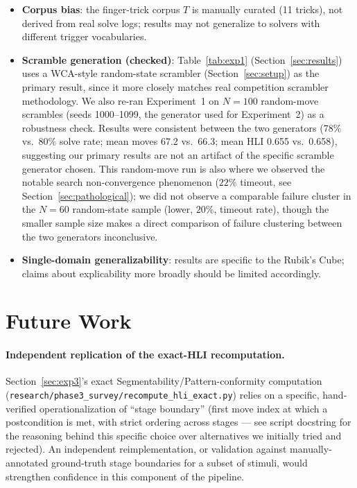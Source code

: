\documentclass[10pt,conference]{article}
\begin{document}
\begin{itemize}
    reliability (ICC(2,k)$=0.91$) --- the RQ-V1 correlation should
    be read as a correlation with a stable group mean, not with any
    single rater's judgment. \emph{Note: these ICC figures were
    initially taken from the survey write-up; they have since been
    independently re-derived from the raw per-rater rating matrix (28
    real CSV files, see
    \texttt{research/phase3\_survey/compute\_icc.py}), matching
    exactly: ICC(2,1)$=0.2563$, ICC(2,k)$=0.9061$.}
  \item \textbf{Corpus bias}: the finger-trick corpus $T$ is
    manually curated (11 tricks), not derived from real solve logs;
    results may not generalize to solvers with different trigger
    vocabularies.
  \item \textbf{Scramble generation (checked)}: Table~\ref{tab:exp1}
    (Section~\ref{sec:results}) uses a WCA-style random-state
    scrambler (Section~\ref{sec:setup}) as the primary result, since
    it more closely matches real competition scrambler methodology.
    We also re-ran Experiment~1 on $N=100$ random-move scrambles
    (seeds 1000--1099, the generator used for Experiment~2) as a
    robustness check. Results were consistent between the two
    generators ($78\%$ vs.\ $80\%$ solve rate; mean moves 67.2 vs.\
    66.3; mean HLI 0.655 vs.\ 0.658), suggesting our primary results
    are not an artifact of the specific scramble generator chosen.
    This random-move run is also where we observed the notable
    search non-convergence phenomenon ($22\%$ timeout, see
    Section~\ref{sec:pathological}); we did not observe a comparable
    failure cluster in the $N=60$ random-state sample (lower,
    $20\%$, timeout rate), though the smaller sample size makes a
    direct comparison of failure clustering between the two
    generators inconclusive.
  \item \textbf{Single-domain generalizability}: results are specific
    to the Rubik's Cube; claims about explicability more broadly
    should be limited accordingly.
\end{itemize}

\section{Future Work}
\label{sec:future}

\paragraph{Independent replication of the exact-HLI recomputation.}
Section~\ref{sec:exp3}'s exact Segmentability/Pattern-conformity
computation (\texttt{research/phase3\_survey/recompute\_hli\_exact.py})
relies on a specific, hand-verified operationalization of ``stage
boundary'' (first move index at which a postcondition is met, with
strict ordering across stages --- see script docstring for the
reasoning behind this specific choice over alternatives we
initially tried and rejected). An independent reimplementation, or
validation against manually-annotated ground-truth stage boundaries
for a subset of stimuli, would strengthen confidence in this
component of the pipeline.
\end{document}
